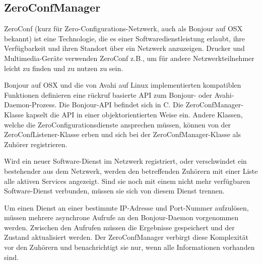 \subsection{ZeroConfManager}

ZeroConf (kurz für Zero-Configurations-Netzwerk, auch als Bonjour auf OSX bekannt) ist eine Technologie, die es einer Softwaredienstleistung erlaubt, ihre Verfügbarkeit und ihren Standort über ein Netzwerk anzuzeigen. Drucker und Multimedia-Geräte verwenden ZeroConf z.B., um für andere Netzwerkteilnehmer leicht zu finden und zu nutzen zu sein.

Bonjour auf OSX und die von Avahi auf Linux implementierten kompatiblen Funktionen definieren eine rückruf basierte API zum Bonjour- oder Avahi-Daemon-Prozess. Die Bonjour-API befindet sich in C. Die ZeroConfManager-Klasse kapselt die API in einer objektorientierten Weise ein. Andere Klassen, welche die ZeroConfigurationsdienste ansprechen müssen, können von der ZeroConfListener-Klasse erben und  sich bei der ZeroConfManager-Klasse als Zuhörer registrieren.

Wird ein neuer Software-Dienst im Netzwerk registriert, oder verschwindet ein bestehender aus dem Netzwerk, werden den betreffenden Zuhörern mit einer Liste alle aktiven Services angezeigt. Sind sie noch mit einem nicht mehr verfügbaren Software-Dienst verbunden, müssen sie sich von diesem Dienst trennen.

Um einen Dienst an einer bestimmte IP-Adresse und Port-Nummer aufzulösen, müssen mehrere asynchrone Aufrufe an den Bonjour-Daemon vorgenommen werden. Zwischen den Aufrufen müssen die Ergebnisse gespeichert und der Zustand aktualisiert werden. Der ZeroConfManager verbirgt diese Komplexität vor den Zuhörern und benachrichtigt sie nur, wenn alle Informationen vorhanden sind.
